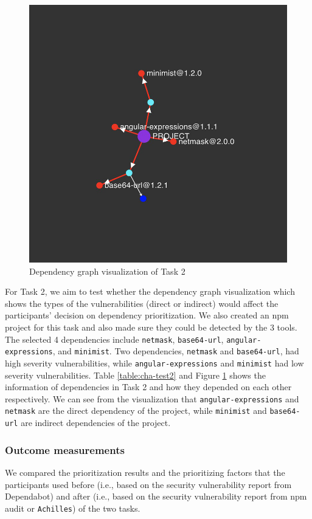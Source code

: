 \documentclass[conference]{IEEEtran}
\begin{document}
	\begin{figure}[tb]
		\centering
		\includegraphics[width=0.8\columnwidth]{Figures/Achilles-Test2.png}
		\caption{Dependency graph visualization of Task 2}
		\label{fig:graphtest2}
	\end{figure}
	
	For Task 2, we aim to test whether the dependency graph visualization which shows the types of the vulnerabilities (direct or indirect) would affect the participants’ decision on dependency prioritization. We also created an npm project for this task and also made sure they could be detected by the 3 tools. The selected 4 dependencies include \texttt{netmask}, \texttt{base64-url}, \texttt{angular-expressions}, and \texttt{minimist}. Two dependencies, \texttt{netmask} and \texttt{base64-url}, had high severity vulnerabilities, while \texttt{angular-expressions} and \texttt{minimist} had low severity vulnerabilities. Table \ref{table:cha-test2} and Figure \ref{fig:graphtest2} shows the information of dependencies in Task 2 and how they depended on each other respectively. We can see from the visualization that \texttt{angular-expressions} and \texttt{netmask} are the direct dependency of the project, while \texttt{minimist} and \texttt{base64-url} are indirect dependencies of the project.
	
	\subsubsection{Outcome measurements} We compared the prioritization results and the prioritizing factors that the participants used before (i.e., based on the security vulnerability report from Dependabot) and after (i.e., based on the security vulnerability report from npm audit or \texttt{Achilles}) of the two tasks.  %
	
\end{document}
